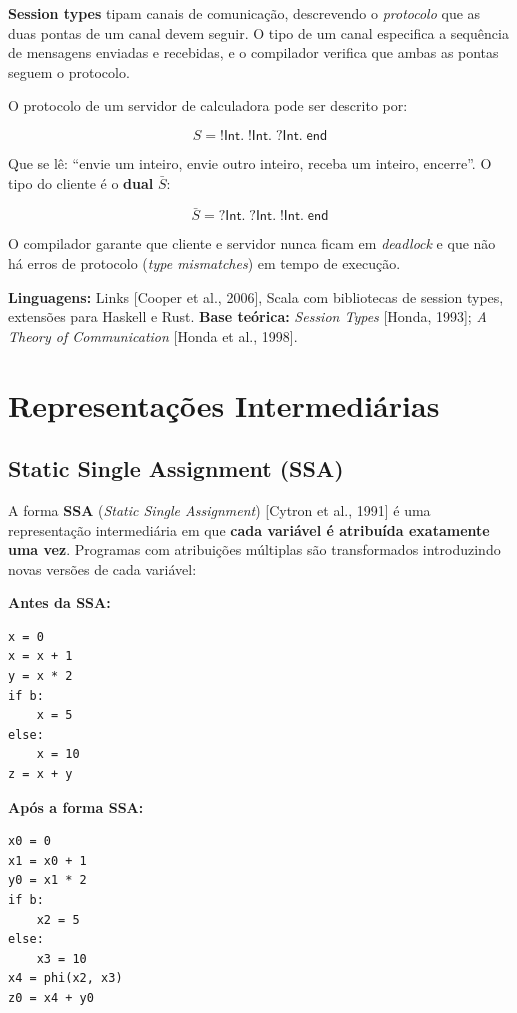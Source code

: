 \textbf{Session types} tipam canais de comunicação, descrevendo o
\emph{protocolo} que as duas pontas de um canal devem seguir. O tipo
de um canal especifica a sequência de mensagens enviadas e recebidas,
e o compilador verifica que ambas as pontas seguem o protocolo.

O protocolo de um servidor de calculadora pode ser descrito por:

\[
S = \mathsf{!Int}.\; \mathsf{!Int}.\; \mathsf{?Int}.\; \mathsf{end}
\]

Que se lê: ``envie um inteiro, envie outro inteiro, receba um inteiro,
encerre''. O tipo do cliente é o \textbf{dual} \(\bar{S}\):

\[
\bar{S} = \mathsf{?Int}.\; \mathsf{?Int}.\; \mathsf{!Int}.\; \mathsf{end}
\]

O compilador garante que cliente e servidor nunca ficam em
\emph{deadlock} e que não há erros de protocolo (\emph{type mismatches})
em tempo de execução.

\textbf{Linguagens:} Links [Cooper et al., 2006], Scala com
bibliotecas de session types, extensões para Haskell e Rust.
\textbf{Base teórica:} \emph{Session Types} [Honda, 1993];
\emph{A Theory of Communication} [Honda et al., 1998].

\section{Representações Intermediárias}

\subsection{Static Single Assignment (SSA)}

A forma \textbf{SSA} (\emph{Static Single Assignment}) [Cytron et al.,
1991] é uma representação intermediária em que \textbf{cada variável é
atribuída exatamente uma vez}. Programas com atribuições múltiplas são
transformados introduzindo novas versões de cada variável:

\textbf{Antes da SSA:}

\begin{verbatim}
x = 0
x = x + 1
y = x * 2
if b:
    x = 5
else:
    x = 10
z = x + y
\end{verbatim}

\textbf{Após a forma SSA:}

\begin{verbatim}
x0 = 0
x1 = x0 + 1
y0 = x1 * 2
if b:
    x2 = 5
else:
    x3 = 10
x4 = phi(x2, x3)
z0 = x4 + y0
\end{verbatim}

